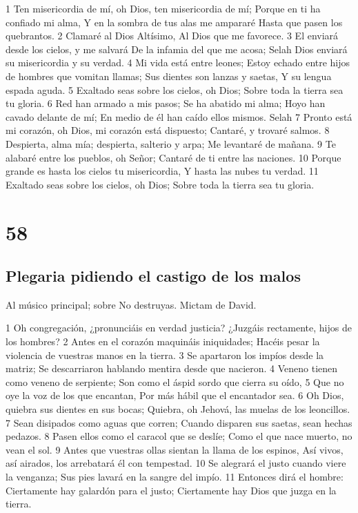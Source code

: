 1 Ten misericordia de mí, oh Dios, ten misericordia de mí;
Porque en ti ha confiado mi alma,
Y en la sombra de tus alas me ampararé
Hasta que pasen los quebrantos.
2 Clamaré al Dios Altísimo,
Al Dios que me favorece.
3 El enviará desde los cielos, y me salvará
De la infamia del que me acosa; Selah
Dios enviará su misericordia y su verdad.
4 Mi vida está entre leones;
Estoy echado entre hijos de hombres que vomitan llamas;
Sus dientes son lanzas y saetas,
Y su lengua espada aguda.
5 Exaltado seas sobre los cielos, oh Dios;
Sobre toda la tierra sea tu gloria.
6 Red han armado a mis pasos;
Se ha abatido mi alma;
Hoyo han cavado delante de mí;
En medio de él han caído ellos mismos. Selah
7 Pronto está mi corazón, oh Dios, mi corazón está dispuesto;
Cantaré, y trovaré salmos.
8 Despierta, alma mía; despierta, salterio y arpa;
Me levantaré de mañana.
9 Te alabaré entre los pueblos, oh Señor;
Cantaré de ti entre las naciones.
10 Porque grande es hasta los cielos tu misericordia,
Y hasta las nubes tu verdad.
11 Exaltado seas sobre los cielos, oh Dios;
Sobre toda la tierra sea tu gloria.

\chapter{58}

\section*{Plegaria pidiendo el castigo de los malos}

Al músico principal; sobre No destruyas. Mictam de David.

1 Oh congregación, ¿pronunciáis en verdad justicia?
¿Juzgáis rectamente, hijos de los hombres?
2 Antes en el corazón maquináis iniquidades;
Hacéis pesar la violencia de vuestras manos en la tierra.
3 Se apartaron los impíos desde la matriz;
Se descarriaron hablando mentira desde que nacieron.
4 Veneno tienen como veneno de serpiente;
Son como el áspid sordo que cierra su oído,
5 Que no oye la voz de los que encantan,
Por más hábil que el encantador sea.
6 Oh Dios, quiebra sus dientes en sus bocas;
Quiebra, oh Jehová, las muelas de los leoncillos.
7 Sean disipados como aguas que corren;
Cuando disparen sus saetas, sean hechas pedazos.
8 Pasen ellos como el caracol que se deslíe;
Como el que nace muerto, no vean el sol.
9 Antes que vuestras ollas sientan la llama de los espinos,
Así vivos, así airados, los arrebatará él con tempestad.
10 Se alegrará el justo cuando viere la venganza;
Sus pies lavará en la sangre del impío.
11 Entonces dirá el hombre: Ciertamente hay galardón para el justo;
Ciertamente hay Dios que juzga en la tierra.

